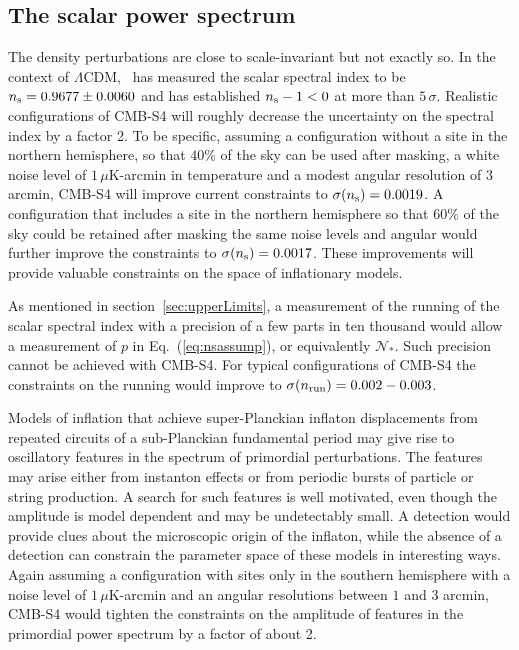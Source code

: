 \subsection{The scalar power spectrum}
The density perturbations are close to scale-invariant but not exactly so. In the context of $\Lambda$CDM, \planck\ has measured the scalar spectral index to be $n_{\rm s}=0.9677\pm0.0060$ and has established $n_{\rm s}-1<0$ at more than $5\,\sigma$. Realistic configurations of CMB-S4 will roughly decrease the uncertainty on the spectral index by a factor 2. To be specific, assuming a configuration without a site in the northern hemisphere, so that $40\%$ of the sky can be used after masking, a white noise level of $1\,\mu$K-arcmin in temperature and a modest angular resolution of $3$ arcmin, CMB-S4 will improve current constraints to $\sigma(n_{\rm s})=0.0019$. A configuration that includes a site in the northern hemisphere so that $60\%$ of the sky could be retained after masking the same noise levels and angular would further improve the constraints to $\sigma(n_{\rm s})=0.0017$. These improvements will provide valuable constraints on the space of inflationary models. 

As mentioned in section~\ref{sec:upperLimits}, a measurement of the running of the scalar spectral index with a precision of a few parts in ten thousand would allow a measurement of $p$ in Eq.~(\ref{eq:nsassump}), or equivalently $\mathcal{N}_\ast$. Such precision cannot be achieved with CMB-S4. For typical configurations of CMB-S4 the constraints on the running would improve to $\sigma(n_{\rm run})=0.002-0.003$. 


Models of inflation that achieve super-Planckian inflaton displacements from repeated circuits of a sub-Planckian fundamental period may give rise to oscillatory features in the spectrum of primordial perturbations. The features may arise either from instanton effects or from periodic bursts of particle or string production. A search for such features is well motivated, even though the amplitude is model dependent and may be undetectably small. A detection would provide clues about the microscopic origin of the inflaton, while the absence of a detection can constrain the parameter space of these models in interesting ways. Again assuming a configuration with sites only in the southern hemisphere with a noise level of $1\,\mu$K-arcmin and an angular resolutions between $1$ and $3$ arcmin, CMB-S4 would tighten the constraints on the amplitude of features in the primordial power spectrum by a factor of about 2.

